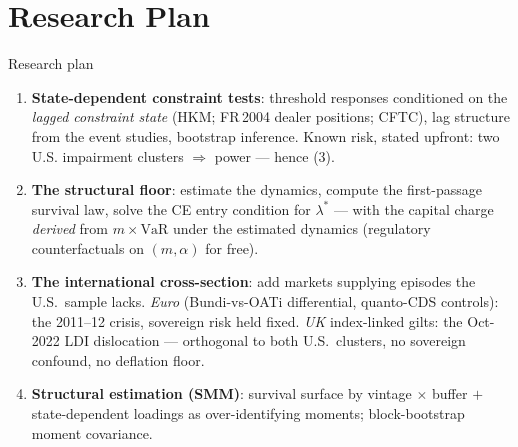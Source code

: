 \documentclass[aspectratio=169]{beamer}
\newcommand{\VaR}{\mathrm{VaR}}
\begin{document}
\section{Research Plan}
\begin{frame}{Research plan}
\begin{enumerate}\setlength\itemsep{0.3em}
  \item \textbf{State-dependent constraint tests}: threshold responses conditioned on the
        \emph{lagged constraint state} (HKM; FR\,2004 dealer positions; CFTC), lag structure
        from the event studies, bootstrap inference. Known risk, stated upfront: two U.S.
        impairment clusters $\Rightarrow$ power --- hence (3).
  \item \textbf{The structural floor}: estimate the dynamics, compute the first-passage
        survival law, solve the CE entry condition for $\lambda^*$ --- with the capital
        charge \emph{derived} from $m\times\VaR$ under the estimated dynamics
        (regulatory counterfactuals on $(m,\alpha)$ for free).
  \item \textbf{The international cross-section}: add markets supplying episodes the U.S.\
        sample lacks. \emph{Euro} (Bund\texteuro i-vs-OAT\texteuro i differential, quanto-CDS
        controls): the 2011--12 crisis, sovereign risk held fixed. \emph{UK} index-linked
        gilts: the Oct-2022 LDI dislocation --- orthogonal to both U.S.\ clusters, no
        sovereign confound, no deflation floor.
  \item \textbf{Structural estimation (SMM)}: survival surface by vintage $\times$ buffer
        $+$ state-dependent loadings as over-identifying moments; block-bootstrap moment
        covariance.
\end{enumerate}
\end{frame}

\end{document}
